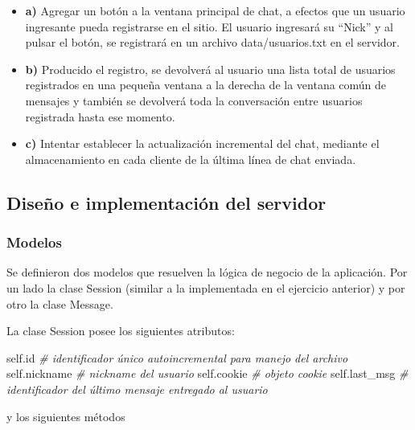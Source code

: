 \documentclass[12pt]{extarticle}
\newenvironment{Shaded}{}{}
\newcommand{\CommentTok}[1]{\textcolor[rgb]{0.38,0.63,0.69}{\textit{{#1}}}}
\newcommand{\NormalTok}[1]{{#1}}
\newcommand{\VariableTok}[1]{\textcolor[rgb]{0.10,0.09,0.49}{{#1}}}
\newcommand{\BuiltInTok}[1]{{#1}}
\begin{document}
\begin{itemize}
\item
  \textbf{a)} Agregar un botón a la ventana principal de chat, a efectos
  que un usuario ingresante pueda registrarse en el sitio. El usuario
  ingresará su ``Nick'' y al pulsar el botón, se registrará en un
  archivo data/usuarios.txt en el servidor.
\item
  \textbf{b)} Producido el registro, se devolverá al usuario una lista
  total de usuarios registrados en una pequeña ventana a la derecha de
  la ventana común de mensajes y también se devolverá toda la
  conversación entre usuarios registrada hasta ese momento.
\item
  \textbf{c)} Intentar establecer la actualización incremental del chat,
  mediante el almacenamiento en cada cliente de la última línea de chat
  enviada.
\end{itemize}

    \subsection{Diseño e implementación del
servidor}\label{diseuxf1o-e-implementaciuxf3n-del-servidor}

\subsubsection{Modelos}\label{modelos}

Se definieron dos modelos que resuelven la lógica de negocio de la
aplicación. Por un lado la clase Session (similar a la implementada en
el ejercicio anterior) y por otro la clase Message.

La clase Session posee los siguientes atributos:

\begin{Shaded}
\begin{Highlighting}[]
\VariableTok{self}\NormalTok{.}\BuiltInTok{id} \CommentTok{# identificador único autoincremental para manejo del archivo}
\VariableTok{self}\NormalTok{.nickname }\CommentTok{# nickname del usuario }
\VariableTok{self}\NormalTok{.cookie }\CommentTok{# objeto cookie}
\VariableTok{self}\NormalTok{.last_msg }\CommentTok{# identificador del último mensaje entregado al usuario}
\end{Highlighting}
\end{Shaded}

y los siguientes métodos
\end{document}
